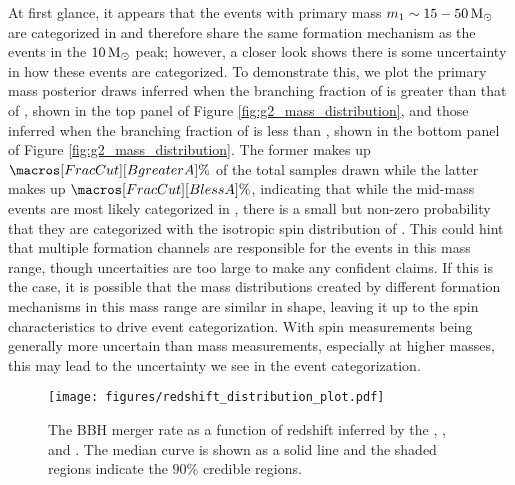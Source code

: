 At first glance, it appears that the events with primary mass $m_1 \sim 15-50 {\,\rm M}_\odot$ are categorized in \popA{} and therefore share the same formation mechanism as the events in the $10{\,\rm M}_\odot$ peak; however, a closer look shows there is some uncertainty in how these events are categorized. To demonstrate this, we plot the primary mass posterior draws inferred when the branching fraction of \contA{} is greater than that of \contB{}, shown in the top panel of Figure \ref{fig:g2_mass_distribution}, and those inferred when the branching fraction of \contA{} is less than \contB{}, shown in the bottom panel of Figure \ref{fig:g2_mass_distribution}. The former makes up $\macros[FracCut][BgreaterA]\%$ of the total samples drawn while the latter makes up $\macros[FracCut][BlessA]\%$, indicating that while the mid-mass events are most likely categorized in \popA{}, there is a small but non-zero probability that they are categorized with the isotropic spin distribution of \popB{}. This could hint that multiple formation channels are responsible for the events in this mass range, though uncertaities are too large to make any confident claims. If this is the case, it is possible that the mass distributions created by different formation mechanisms in this mass range are similar in shape, leaving it up to the spin characteristics to drive event categorization. With spin measurements being generally more uncertain than mass measurements, especially at higher masses, this may lead to the uncertainty we see in the event categorization. 

\begin{figure}[]
  \begin{centering}
      \texttt{[image: figures/redshift\_distribution\_plot.pdf]}
      \caption{The BBH merger rate as a function of redshift inferred by the \base{}, \comp{}, and \brucepaper. The median curve is shown as a solid line and the shaded regions indicate the $90\%$ credible regions.}
      \label{fig:redshift_distribution}
  \end{centering}
\end{figure}

